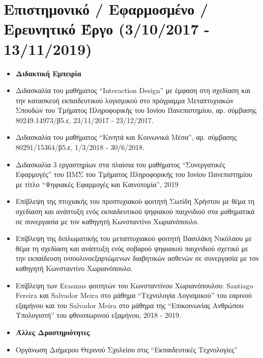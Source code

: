 \documentclass[%
    11pt,
  oneside
  ]{memoir}
\let\oldsection\section
\renewcommand{\section}[1]{%
  \oldsection{#1}
  \leavevmode
  \par
  \vspace{\dimexpr-\baselineskip-\parskip}
}
\begin{document}
\hypertarget{ux3b5ux3c0ux3b9ux3c3ux3c4ux3b7ux3bcux3bfux3bdux3b9ux3baux3cc-ux3b5ux3c6ux3b1ux3c1ux3bcux3bfux3c3ux3bcux3adux3bdux3bf-ux3b5ux3c1ux3b5ux3c5ux3bdux3b7ux3c4ux3b9ux3baux3cc-ux3adux3c1ux3b3ux3bf-3102017---13112019}{%
\section{Επιστημονικό / Εφαρμοσμένο / Ερευνητικό Έργο (3/10/2017 -
13/11/2019)}\label{ux3b5ux3c0ux3b9ux3c3ux3c4ux3b7ux3bcux3bfux3bdux3b9ux3baux3cc-ux3b5ux3c6ux3b1ux3c1ux3bcux3bfux3c3ux3bcux3adux3bdux3bf-ux3b5ux3c1ux3b5ux3c5ux3bdux3b7ux3c4ux3b9ux3baux3cc-ux3adux3c1ux3b3ux3bf-3102017---13112019}}

\begin{itemize}
\tightlist
\item
  \textbf{Διδακτική Εμπειρία}
\item
  Διδασκαλία του μαθήματος ``Interaction Design'' με έμφαση στη σχεδίαση
  και την κατασκευή εκπαιδευτικού λογισμικού στο πρόγραμμα Μεταπτυχιακών
  Σπουδών του Τμήματος Πληροφορικής του Ιονίου Πανεπιστημίου, αρ.
  σύμβασης 80249.14973/β5.ε, 23/11/2017 - 23/12/2017.
\item
  Διδασκαλία του μαθήματος ``Κινητά και Κοινωνικά Μέσα'', αρ. σύμβασης
  80291/15364/β5.ε, 1/3/2018 - 30/6/2018.
\item
  Διδασκαλία 3 εργαστηρίων στα πλαίσια του μαθήματος ``Συνεργατικές
  Εφαρμογές'' του ΠΜΣ του Τμήματος Πληροφορικής του Ιονίου Πανεπιστημίου
  με τίτλο ``Ψηφιακές Εφαρμογές και Καινοτομία'', 2019
\item
  Επίβλεψη της πτυχιακής του προπτυχιακού φοιτητή Σωτίδη Χρήστου με θέμα
  τη σχεδίαση και ανάπτυξη ενός εκπαιδευτικού ψηφιακού παιχνιδιού στα
  μαθηματικά σε συνεργασία με τον καθηγητή Κωνσταντίνο Χωριανόπουλο.
\item
  Επίβλεψη της διπλωματικής του μεταπτυχιακού φοιτητή Βασιλάκη Νικόλαου
  με θέμα τη σχεδίαση και ανάπτυξη ενός σοβαρού ψηφιακού παιχνιδιού
  σχετικό με την εκπαίδευση ινσουλινοεξαρτώμενων διαβητικών ασθενών σε
  συνεργασία με τον καθηγητή Κωνσταντίνο Χωριανόπουλο.
\item
  Επίβλεψη των Erasmus φοιτητών του Κωνσταντίνου Χωριανόπουλου: Santiago
  Fereira και Salvador Meira στο μάθημα ``Τεχνολογία Λογισμικού'' του
  εαρινού εξαμήνου και του Salvador Meira στο μάθημα της ``Επικοινωνίας
  Ανθρώπου Υπολογιστή'' του φθινοπωρινού εξαμήνου, 2018 - 2019.
\item
  \textbf{Άλλες Δραστηριότητες}
\item
  Οργάνωση Διήμερου Θερινού Σχολείου στις ``Εκπαιδευτικές Τεχνολογίες''

\end{itemize}
\end{document}
